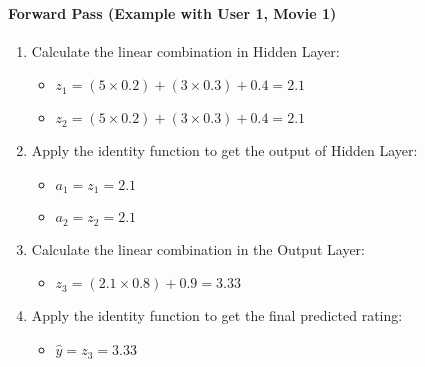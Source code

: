 \documentclass[a4paper]{article}
\theoremstyle{plain}
\theoremstyle{definition}
\begin{document}
\paragraph{Forward Pass (Example with User 1, Movie 1)}
\begin{enumerate}
  \item Calculate the linear combination in Hidden Layer:
  \begin{itemize}
    \item \( z_1 = (5 \times 0.2) + (3 \times 0.3) + 0.4 = 2.1 \)
    \item \( z_2 = (5 \times 0.2) + (3 \times 0.3) + 0.4 = 2.1 \)
  \end{itemize}
  \item Apply the identity function to get the output of Hidden Layer:
  \begin{itemize}
    \item \( a_1 = z_1 = 2.1 \)
    \item \( a_2 = z_2 = 2.1 \)
  \end{itemize}
  \item Calculate the linear combination in the Output Layer:
  \begin{itemize}
    \item \( z_3 = (2.1 \times 0.8) + 0.9 = 3.33 \)
  \end{itemize}
  \item Apply the identity function to get the final predicted rating:
  \begin{itemize}
    \item \( \hat{y} = z_3 = 3.33 \)
  \end{itemize}
\end{enumerate}
\end{document}
